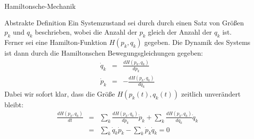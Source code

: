 \begin{chapter}{\titlestr}
\begin{section}{Hamiltonsche-Mechanik}
\begin{subsection}{Abstrakte Definition}
Ein Systemzustand sei durch durch einen Satz von Größen $p_k$ und $q_k$ beschrieben, wobei die Anzahl der $p_k$ gleich der Anzahl der $q_k$ ist. Ferner sei eine Hamilton-Funktion $H(p_k,q_k)$ gegeben. Die Dynamik des Systems ist dann durch die Hamiltonschen Bewegungsgleichungen gegeben:
\begin{eqnarray*}
\dot{q}_k &=& \frac{dH(p_k,q_k)}{dp_k}\\
\dot{p}_k &=& -\frac{dH(p_k,q_k)}{dq_k}
\end{eqnarray*}
Dabei wir sofort klar, dass die Größe $H(p_k(t),q_k(t))$ zeitlich unverändert bleibt:
\begin{eqnarray*}
\frac{dH(p_k,q_k)}{dt} &=& \sum_k\frac{dH(p_k,q_k)}{dp_k}\dot{p}_k+\sum_k\frac{dH(p_k,q_k)}{dq_k}\dot{q}_k\\
&=& \sum_k\dot{q}_k\dot{p}_k-\sum_k\dot{p}_k\dot{q}_k=0
\end{eqnarray*}
\end{subsection}


\end{section}
\end{chapter}
